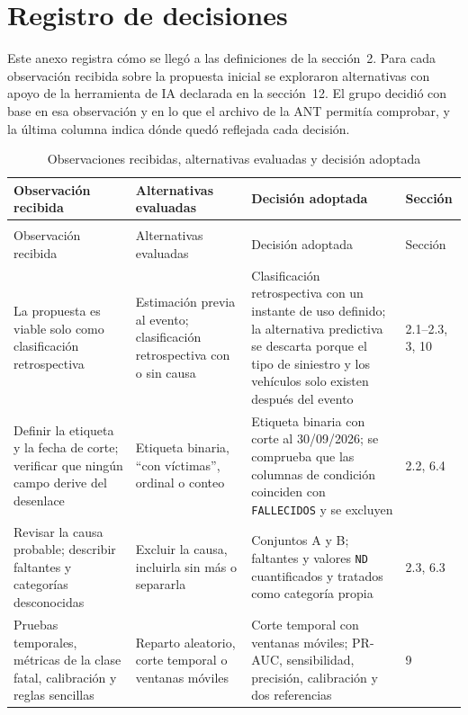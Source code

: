 \section{Registro de decisiones}

Este anexo registra cómo se llegó a las definiciones de la sección~2. Para cada observación recibida sobre la propuesta inicial se exploraron alternativas con apoyo de la herramienta de IA declarada en la sección~12. El grupo decidió con base en esa observación y en lo que el archivo de la ANT permitía comprobar, y la última columna indica dónde quedó reflejada cada decisión.

\begin{longtable}{>{\raggedright\arraybackslash}p{3.6cm}>{\raggedright\arraybackslash}p{3.6cm}>{\raggedright\arraybackslash}p{5.0cm}p{1.6cm}}
\caption{Observaciones recibidas, alternativas evaluadas y decisión adoptada}
\label{tab:correcciones}\\
\toprule
Observación recibida & Alternativas evaluadas & Decisión adoptada & Sección \\
\midrule
\endfirsthead
\multicolumn{4}{l}{\footnotesize\itshape (continuación)}\\
\toprule
Observación recibida & Alternativas evaluadas & Decisión adoptada & Sección \\
\midrule
\endhead
\bottomrule
\endfoot
La propuesta es viable solo como clasificación retrospectiva & Estimación previa al evento; clasificación retrospectiva con o sin causa & Clasificación retrospectiva con un instante de uso definido; la alternativa predictiva se descarta porque el tipo de siniestro y los vehículos solo existen después del evento & 2.1--2.3, 3, 10 \\
Definir la etiqueta y la fecha de corte; verificar que ningún campo derive del desenlace & Etiqueta binaria, ``con víctimas'', ordinal o conteo & Etiqueta binaria con corte al 30/09/2026; se comprueba que las columnas de condición coinciden con \texttt{FALLECIDOS} y se excluyen & 2.2, 6.4 \\
Revisar la causa probable; describir faltantes y categorías desconocidas & Excluir la causa, incluirla sin más o separarla & Conjuntos A y B; faltantes y valores \texttt{ND} cuantificados y tratados como categoría propia & 2.3, 6.3 \\
Pruebas temporales, métricas de la clase fatal, calibración y reglas sencillas & Reparto aleatorio, corte temporal o ventanas móviles & Corte temporal con ventanas móviles; PR-AUC, sensibilidad, precisión, calibración y dos referencias & 9 \\

\end{longtable}
